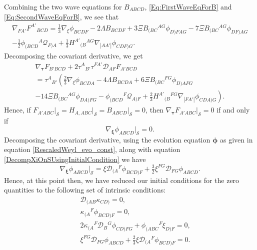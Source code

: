 \documentclass[10pt,a4paper]{article}
\theoremstyle{plain}
\begin{document}
\medskip
Combining the two wave equations for $B_{ABCD}$,
\eqref{Eq:FirstWaveEqForB} and \eqref{Eq:SecondWaveEqForB}, we see
that
\begin{multline}
     \nabla_{FA'}F^{A'}{}_{BCD} = \tfrac{1}{3} \nabla_{\xi}{}\phi_{BCDF} - 2 \Lambda B_{BCDF} + 3\Xi B_{(BC}{}^{AG}  \phi_{D)FAG}  - 7 \Xi B_{(BC}{}^{AG}\phi_{DF)AG} \\-  \tfrac{1}{2} \phi_{(BCD}{}^{A}\mathcal{Q}_{F)A} + \tfrac{1}{3} H^{A'}{}_{(B}{}^{AG}\nabla_{|AA'|}\phi_{CDF)G}\label{CurlOfFInTermsOfCollineation}. 
\end{multline}
Decomposing the covariant derivative, we get
\begin{multline}
\nabla_{\bm\tau} F_{B'BCD} + 2 \tau^{A}{}_{B'} \tau^{FA'} \mathcal{D}_{AF}F_{A'BCD} \\
= \tau^{A}{}_{B'}\left(\tfrac{2}{3} \nabla_{\xi}{}\phi_{BCDA}  - 4 \Lambda  B_{BCDA} + 6 \Xi  B_{(BC}{}^{FG}  \phi_{D)AFG}  \right. \\ \left.  - 14 \Xi  B_{(BC}{}^{AG}\phi_{DA)FG}  -   \phi_{(BCD}{}^{F}\mathcal{Q}_{A)F}   + \tfrac{2}{3}  H^{A'}{}_{(B}{}^{FG}\nabla_{|FA'|}\phi_{CDA)G}\right).
\end{multline}
Hence, if
$F_{A'ABC}\big\vert_{\mathcal{S}}=H_{A,ABC}\big\vert_{\mathcal{S}}=B_{ABCD}\big\vert_{\mathcal{S}}=0$,
then $\nabla_{\bm\tau}F_{A'ABC}\big\vert_{\mathcal{S}}=0$ if and only
if
\[ \nabla_{\bm\xi}\phi_{ABCD}\big\vert_{\mathcal{S}}=0.\]
Decomposing the covariant derivative, using the evolution equation $\bm\phi$
as given in equation \eqref{RescaledWeyl_evo_const}, along with equation
\eqref{DecompXiOnSUsingInitialCondition} we have
\[ \nabla_{\bm\xi}\phi_{ABCD}\big\vert_{\mathcal{S}} =  \xi \mathcal{D}_{(A}{}^{F}\phi_{BCD)F} + \tfrac{3}{2} \xi^{FG} \mathcal{D}_{FG}\phi_{ABCD}. \]
Hence, at this point then, we have reduced our initial conditions for the
zero quantities to the following set of intrinsic conditions:
\begin{subequations}
\begin{eqnarray}
    && \mathcal{D}_{(AB}\kappa_{CD)}=0,\\ &&
  \kappa_{(A}{}^F\phi_{BCD)F}=0,\\ && 2
  \kappa_{(A}{}^{F}\mathcal{D}_{B}{}^{G}\phi_{CD)FG} +
  \phi_{(ABC}{}^{F}\xi_{D)F} = 0,\label{RedundantCondition1}\\ &&
  \xi^{FG}\mathcal{D}_{FG}\phi_{ABCD} +
  \tfrac{2}{3}\xi\mathcal{D}_{(A}{}^F\phi_{BCD)F} =
  0. \label{RedundantCondition2}
\end{eqnarray}
\end{subequations}
\end{document}
